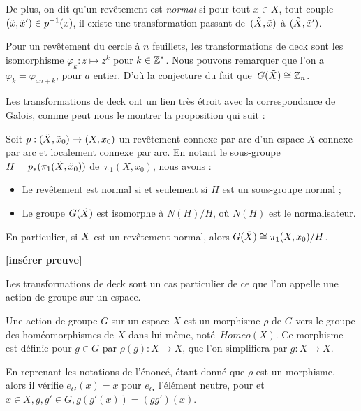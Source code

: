 De plus, on dit qu'un revêtement est \emph{normal} si pour tout $x\in X$, tout couple~$(\Tilde{x},\Tilde{x}')\in p^{-1}(x)$, il existe une transformation passant de~$(\Tilde{X},\Tilde{x})$ à $(\Tilde{X},\Tilde{x}')$.

\begin{exemple}
Pour un revêtement du cercle à $n$ feuillets, les transformations de deck sont les isomorphisme $\varphi_k:z\mapsto z^k$ pour $k\in\mathbb{Z}^*$. Nous pouvons remarquer que l'on a $\varphi_k=\varphi_{an+k}$, pour $a$ entier. D'où la conjecture du fait que~$G(\Tilde{X})\cong\mathbb{Z}_n$.
\end{exemple}

Les transformations de deck ont un lien très étroit avec la correspondance de Galois, comme peut nous le montrer la proposition qui suit : 

\begin{proposition}
Soit $p:(\Tilde{X},\Tilde{x}_0)\to(X,x_0)$ un revêtement connexe par arc d'un espace $X$ connexe par arc et localement connexe par arc. En notant le sous-groupe $H=p_\ast(\pi_1(\Tilde{X},\Tilde{x}_0))$ de~$\pi_1(X,x_0)$, nous avons : \begin{itemize}
    \item Le revêtement est normal si et seulement si $H$ est un sous-groupe normal ;
    \item Le groupe $G(\Tilde{X})$ est isomorphe à $N(H)/H$, où $N(H)$ est le normalisateur.
\end{itemize}
En particulier, si $\Tilde{X}$ est un revêtement normal, alors $G(\Tilde{X})\cong \pi_1(X,x_0)/H$.
\end{proposition}

\textbf{[insérer preuve]}

Les transformations de deck sont un cas particulier de ce que l'on appelle une action de groupe sur un espace.

\begin{definition}\label{def:group-action}
Une action de groupe $G$ sur un espace $X$ est un morphisme $\rho$ de $G$ vers le groupe des homéomorphismes de $X$ dans lui-même, noté~$Homeo(X)$. Ce morphisme est définie pour $g\in G$ par $\rho(g):X\to X$, que l'on simplifiera par $g:X\to X$.
\end{definition}

\begin{remark}
En reprenant les notations de l'énoncé, étant donné que $\rho$ est un morphisme, alors il vérifie $e_G(x)=x$ pour $e_G$ l'élément neutre, pour et $x\in X, g,g'\in G, {g(g'(x))=(gg')(x)}$.
\end{remark}

